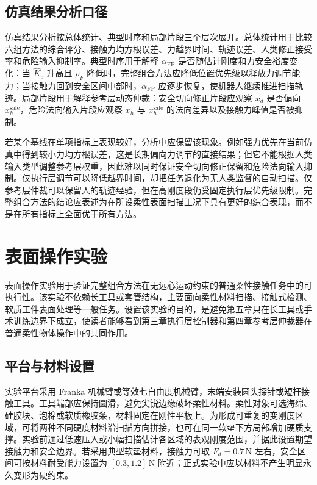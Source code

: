 \subsection{仿真结果分析口径}
\label{subsec:ch5_simulation_analysis_setting}

仿真结果分析按总体统计、典型时序和局部片段三个层次展开。总体统计用于比较六组方法的综合评分、接触力均方根误差、力越界时间、轨迹误差、人类修正接受率和危险输入抑制率。典型时序用于解释 $\alpha_{\mathrm{FP}}$ 是否随估计刚度和力安全裕度变化：当 $\hat K_e$ 升高且 $\rho_F$ 降低时，完整组合方法应降低位置优先级以释放力调节能力；当接触力回到安全区间中部时，$\alpha_{\mathrm{FP}}$ 应逐步恢复，使机器人继续推进扫描轨迹。局部片段用于解释参考层动态仲裁：安全切向修正片段应观察 $x_d$ 是否偏向 $x_h^{\mathrm{safe}}$，危险法向输入片段应观察 $x_h$ 与 $x_h^{\mathrm{safe}}$ 的法向差异以及接触力峰值是否被抑制。

若某个基线在单项指标上表现较好，分析中应保留该现象。例如强力优先在当前仿真中得到较小力均方根误差，这是长期偏向力调节的直接结果；但它不能根据人类输入类型调整参考层权重，因此难以同时保证安全切向修正保留和危险法向输入抑制。仅执行层调节可以降低越界时间，却把任务退化为无人类监督的自动扫描。仅参考层仲裁可以保留人的轨迹经验，但在高刚度段仍受固定执行层优先级限制。完整组合方法的结论应表述为在所设柔性表面扫描工况下具有更好的综合表现，而不是在所有指标上全面优于所有方法。

\section{表面操作实验}
\label{sec:ch5_surface_experiment}

表面操作实验用于验证完整组合方法在无远心运动约束的普通柔性接触任务中的可执行性。该实验不依赖长工具或套管结构，主要面向柔性材料扫描、接触式检测、软质工件表面处理等一般任务。设置该实验的目的，是避免第五章只在长工具或手术训练边界下成立，使读者能够看到第三章执行层控制器和第四章参考层仲裁器在普通柔性物体操作中的共同作用。

\subsection{平台与材料设置}
\label{subsec:ch5_surface_platform}

实验平台采用 Franka 机械臂或等效七自由度机械臂，末端安装圆头探针或短杆接触工具。工具端部应保持圆滑，避免尖锐边缘破坏柔性材料。柔性对象可选海绵、硅胶块、泡棉或软质橡胶条，材料固定在刚性平板上。为形成可重复的变刚度区域，可将两种不同硬度材料沿扫描方向拼接，也可在同一软垫下方局部增加硬质支撑。实验前通过低速压入或小幅扫描估计各区域的表观刚度范围，并据此设置期望接触力和安全边界。若采用典型软垫材料，接触力可取 $F_d=0.7\,\mathrm{N}$ 左右，安全区间可按材料耐受能力设置为 $[0.3,1.2]\,\mathrm{N}$ 附近；正式实验中应以材料不产生明显永久变形为硬约束。

